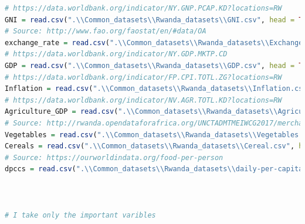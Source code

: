 \documentclass[11pt]{article}
\begin{document}
\begin{lstlisting}[language= R]
# https://data.worldbank.org/indicator/NY.GNP.PCAP.KD?locations=RW
GNI = read.csv(".\\Common_datasets\\Rwanda_datasets\\GNI.csv", head = TRUE, sep = ",", stringsAsFactors = FALSE)
# Source: http://www.fao.org/faostat/en/#data/OA
exchange_rate = read.csv(".\\Common_datasets\\Rwanda_datasets\\Exchange_rate.csv", head = TRUE, sep = ",", stringsAsFactors = FALSE)
# https://data.worldbank.org/indicator/NY.GDP.MKTP.CD
GDP = read.csv(".\\Common_datasets\\Rwanda_datasets\\GDP.csv", head = TRUE, sep = ",", stringsAsFactors = FALSE)
# https://data.worldbank.org/indicator/FP.CPI.TOTL.ZG?locations=RW
Inflation = read.csv(".\\Common_datasets\\Rwanda_datasets\\Inflation.csv", head = TRUE, sep = ",", stringsAsFactors = FALSE)
# https://data.worldbank.org/indicator/NV.AGR.TOTL.KD?locations=RW
Agriculture_GDP = read.csv(".\\Common_datasets\\Rwanda_datasets\\Agriculture_GDP.csv", head = TRUE, sep = ",", stringsAsFactors = FALSE)
# Source: http://rwanda.opendataforafrica.org/UNCTADMTMEIWCG2017/merchandise-trade-matrix-product-groups-exports-and-imports-in-thousands-of-dollars-annual-1995-2016
Vegetables = read.csv(".\\Common_datasets\\Rwanda_datasets\\Vegetables.csv", head = TRUE, sep = ",", stringsAsFactors = FALSE)
Cereals = read.csv(".\\Common_datasets\\Rwanda_datasets\\Cereal.csv", head = TRUE, sep = ",", stringsAsFactors = FALSE)
# Source: https://ourworldindata.org/food-per-person
dpccs = read.csv(".\\Common_datasets\\Rwanda_datasets\\daily-per-capita-caloric-supply.csv", head = TRUE, sep = ",", stringsAsFactors = FALSE)



# I take only the important varibles 


\end{lstlisting}
\end{document}
